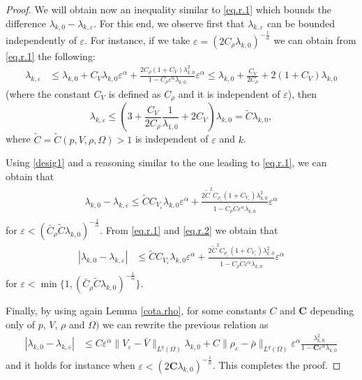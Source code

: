 \documentclass[10pt,a4paper]{amsart}
\begin{document}
\begin{proof}
We will obtain now an inequality similar to \eqref{eq.r.1} which bounds the difference $\lambda_{k,0}-\lambda_{k,\varepsilon}$. For this end, we observe first that   $\lambda_{k,\varepsilon}$ can be bounded independently of $\varepsilon$. For instance, if we take  $\varepsilon=  (2  C_\rho \lambda_{k,0})^{-\frac{1}{\alpha}}$ we can obtain from \eqref{eq.r.1} the following:
\begin{align*}
\lambda_{k,\varepsilon} &\leq \lambda_{k,0} +  C_V \lambda_{k,0}\varepsilon^\alpha + \frac{2C_\rho (1+C_V)\lambda_{k,0}^2}{1-C_\rho \varepsilon^\alpha \lambda_{k,0}}\varepsilon^\alpha\leq \lambda_{k,0} +  \frac{  C_V}{2C_\rho}  +    2 (1+C_V) \lambda_{k,0}
\end{align*}
(where the constant $C_V$ is defined as  $C_\rho$ and it is independent of $\varepsilon$), then
\begin{equation} \label{desig1}
\lambda_{k,\varepsilon} \leq   \left(3+ \frac{ C_V }{2 C_\rho}\frac{1}{\lambda_{1,0}} +2 C_V \right) \lambda_{k,0} = \tilde C \lambda_{k,0},
\end{equation}
where $\tilde C=\tilde C(p,V,\rho,\Omega)>1$ is independent of $\varepsilon$ and $k$.

Using \eqref{desig1} and a reasoning similar to the one leading to  \eqref{eq.r.1}, we can obtain that
\begin{align} \label{eq.r.2}
\begin{split}
\lambda_{k,0}-\lambda_{k,\varepsilon} \leq\tilde C C_{V_\varepsilon} \lambda_{k,0} \varepsilon^\alpha +   \frac{2 \tilde C^2  C_{\rho_\varepsilon} (1+C_{V_\varepsilon}) \lambda_{k,0}^2}{1- C_\rho \tilde C  \varepsilon^\alpha \lambda_{k,0}} \varepsilon^\alpha
\end{split}
\end{align}
for $\varepsilon <(\bar C_\rho \tilde C \lambda_{k,0})^{-\frac{1}{\alpha}}$. From \eqref{eq.r.1} and \eqref{eq.r.2} we obtain that
\begin{align*}
|\lambda_{k,0}-\lambda_{k,\varepsilon}| &\leq  
\tilde C C_{V_\varepsilon} \lambda_{k,0} \varepsilon^\alpha +  \frac{2 \tilde C^2 C_{\rho_\varepsilon} (1+C_{V_\varepsilon}) \lambda_{k,0}^2}{1-C_\rho \tilde C \varepsilon^\alpha \lambda_{k,0}}\varepsilon^\alpha 
\end{align*}
for $\varepsilon < \min\{1,(\bar C_\rho \tilde C \lambda_{k,0})^{-\frac{1}{\alpha}}\}$.

Finally, by using again Lemma \ref{cota.rho}, for some constants $C$ and $\textbf{C}$  depending only of $p$,  $V$, $\rho$ and $\Omega)$ we can rewrite the previous relation as
\begin{align*}
|\lambda_{k,0}-\lambda_{k,\varepsilon}| &\leq  
C  \varepsilon^\alpha \|V_\varepsilon - \bar V\|_{L^q(\Omega)} \lambda_{k,0} + C  \|\rho_\varepsilon - \bar \rho\|_{L^q(\Omega)}  \varepsilon^\alpha \frac{ \lambda_{k,0}^2}{1- \textbf{C} \varepsilon^\alpha \lambda_{k,0}}
\end{align*}
and it holds for instance when $\varepsilon < (2\textbf{C} \lambda_{k,0})^{-\frac{1}{\alpha}}$. This completes the proof.
\end{proof}
\end{document}
